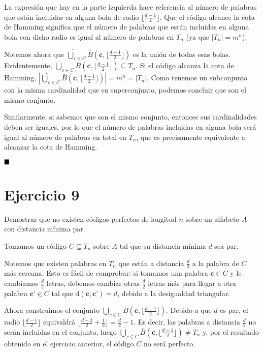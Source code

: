 La expresión que hay en la parte izquierda hace referencia al número de palabras que están incluidas en alguna bola de radio $\lfloor\frac{d-1}{2}\rfloor$. Que el código alcance la cota de Hamming significa que el número de palabras que están incluidas en alguna bola con dicho radio es igual al número de palabras en $T_n$ (ya que $|T_n| = m^n$).

Notemos ahora que $\dot{\bigcup}_{c\in C}\overline{B}(\textbf{c}, \lfloor\frac{d-1}{2}\rfloor)$ es la unión de todas esas bolas. Evidentemente, $\dot{\bigcup}_{c\in C}\overline{B}(\textbf{c}, \lfloor\frac{d-1}{2}\rfloor) \subseteq T_n$. Si el código alcanza la cota de Hamming, $|\dot{\bigcup}_{c\in C}\overline{B}(\textbf{c}, \lfloor\frac{d-1}{2}\rfloor)| = m^n = |T_n|$. Como tenemos un subconjunto con la misma cardinalidad que su superconjunto, podemos concluir que son el mismo conjunto.

Similarmente, si sabemos que son el mismo conjunto, entonces sus cardinalidades deben ser iguales, por lo que el número de palabras incluidas en alguna bola será igual al número de palabras en total en $T_n$, que es precisamente equivalente a alcanzar la cota de Hamming.

$\qed$

\section{Ejercicio 9}

\begin{formulationBox}
	Demostrar que no existen códigos perfectos de longitud $n$ sobre un alfabeto $A$ con distancia mínima par.
\end{formulationBox}

Tomamos un código $C\subseteq T_n$ sobre $A$ tal que su distancia mínima $d$ sea par.

Notemos que existen palabras en $T_n$ que están a distancia $\frac{d}{2}$ a la palabra de $C$ más cercana. Esto es fácil de comprobar: si tomamos una palabra $\textbf{c}\in C$ y le cambiamos $\frac{d}{2}$ letras, debemos cambiar otras $\frac{d}{2}$ letras más para llegar a otra palabra $\textbf{c'}\in C$ tal que $\mathrm{d}(\textbf{c}, \textbf{c'})=d$, debido a la desigualdad triangular.

Ahora construimos el conjunto $\dot{\bigcup}_{c\in C}\overline{B}(\textbf{c}, \lfloor\frac{d-1}{2}\rfloor)$. Debido a que $d$ es par, el radio $\lfloor\frac{d-1}{2}\rfloor$ equivaldrá $\lfloor\frac{d-2}{2}+\frac{1}{2}\rfloor = \frac{d}{2}-1$. Es decir, las palabras a distancia $\frac{d}{2}$ no serán incluidas en el conjunto, luego $\dot{\bigcup}_{c\in C}\overline{B}(\textbf{c}, \lfloor\frac{d-1}{2}\rfloor) \neq T_n$ y, por el resultado obtenido en el ejercicio anterior, el código $C$ no será perfecto.

